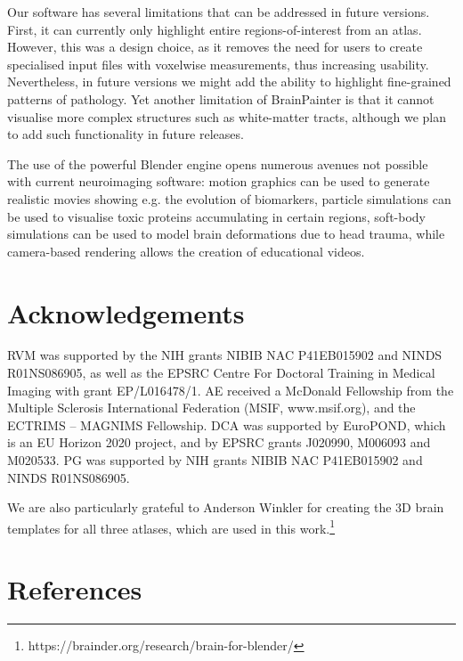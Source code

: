 \documentclass[final,times,twocolumn,authoryear]{elsarticle}
\begin{document}
Our software has several limitations that can be addressed in future versions. First, it can currently only highlight entire regions-of-interest from an atlas. However, this was a design choice, as it removes the need for users to create specialised input files with voxelwise measurements, thus increasing usability. Nevertheless, in future versions we might add the ability to highlight fine-grained patterns of pathology. Yet another limitation of BrainPainter is that it cannot visualise more complex structures such as white-matter tracts, although we plan to add such functionality in future releases. 

The use of the powerful Blender engine opens numerous avenues not possible with current neuroimaging software: motion graphics can be used to generate realistic movies showing e.g. the evolution of biomarkers, particle simulations can be used to visualise toxic proteins accumulating in certain regions, soft-body simulations can be used to model brain deformations due to head trauma, while camera-based rendering allows the creation of educational videos. 

\FloatBarrier
\section{Acknowledgements}


RVM was supported by the NIH grants NIBIB NAC P41EB015902 and NINDS R01NS086905, as well as the EPSRC Centre For Doctoral Training in Medical Imaging with grant EP/L016478/1. AE received a McDonald Fellowship from the Multiple Sclerosis International Federation (MSIF, www.msif.org), and the ECTRIMS -- MAGNIMS Fellowship. DCA was supported by EuroPOND, which is an EU Horizon 2020 project, and by EPSRC grants J020990, M006093 and M020533. PG was supported by NIH grants NIBIB NAC P41EB015902 and NINDS R01NS086905. 

We are also particularly grateful to Anderson Winkler for creating the 3D brain templates for all three atlases, which are used in this work.\footnote{https://brainder.org/research/brain-for-blender/}








\section{References}



\end{document}
